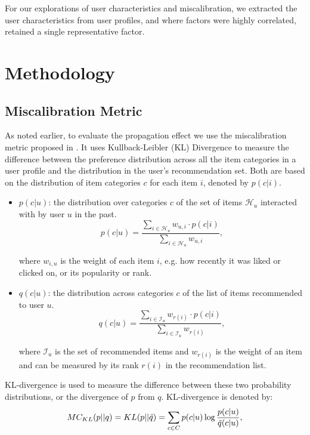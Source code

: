 For our explorations of user characteristics and miscalibration, we extracted the user characteristics from user profiles, and where factors were highly correlated, retained a single representative factor. 

\section{Methodology}
 
\subsection{Miscalibration Metric} 

As noted earlier, to evaluate the propagation effect we use the miscalibration metric proposed in \cite{steck2018calibrated}. It uses Kullback-Leibler (KL) Divergence to measure the difference between the preference distribution across all the item categories in a user profile and the distribution in the user's recommendation set. Both are based on the distribution of item categories $c$ for each item $i$, denoted by $p(c|i)$.

\begin{itemize}
    \item $p(c|u)$: the distribution over categories $c$ of the set of items $\mathcal{H}_u$ interacted with by user $u$ in the past.
    \begin{equation}\label{input_preference}
        p(c|u) = \frac{\sum_{i \in \mathcal{H}_u} w_{u, i} \cdot p(c|i)}{\sum_{i \in \mathcal{H}_u} w_{u, i}},
    \end{equation}

    where $w_{i,u}$ is the weight of each item $i$, e.g. how recently it was liked or clicked on, or its popularity or rank.
    
    \item $q(c|u)$: the distribution across categories $c$ of the list of items recommended to user $u$.
    \begin{equation}
        q(c|u) = \frac{\sum_{i \in \mathcal{I}_u} w_{r(i)} \cdot p(c|i)}{\sum_{i \in \mathcal{I}_u} w_{r(i)}},
    \end{equation}
    
    where $\mathcal{I}_u$ is the set of recommended items and $w_{r(i)}$ is the weight of an item and can be measured by its rank $r(i)$ in the recommendation list.
\end{itemize}

KL-divergence \cite{kullback1997information} is used to measure the difference between these two probability distributions, or the divergence of $p$ from $q$. KL-divergence is denoted by:
\begin{equation} \label{kl}
MC_{KL}(p||q) = KL(p||\Tilde{q})= \sum_{c \in C}{p(c|u)\log\frac{p(c|u)}{\Tilde{q}(c|u)}},
\end{equation}

